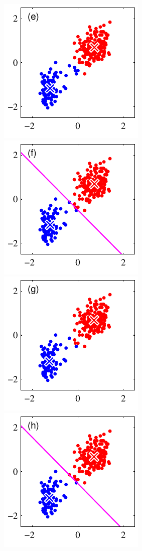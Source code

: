 \documentclass[aspectratio=169,xcolor=dvipsnames,svgnames,x11names,fleqn]{beamer}
\begin{document}
\begin{frame}
\begin{center}
    \includegraphics[scale=.4]{figures/Figure91e.pdf}
    \includegraphics[scale=.4]{figures/Figure91f.pdf} \\
    \includegraphics[scale=.4]{figures/Figure91g.pdf}
    \includegraphics[scale=.4]{figures/Figure91h.pdf}

\end{center}
\end{frame}
\end{document}
